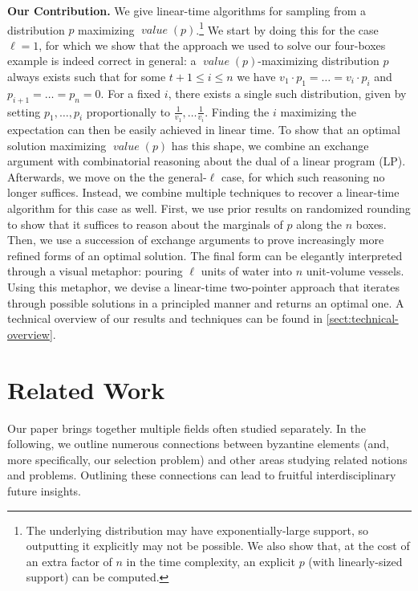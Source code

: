 \documentclass[sigconf,nonacm]{aamas}
\DeclareMathOperator{\valueText}{\textit{value}}
\newcommand{\val}[1]{\valueText({#1})}
\begin{document}
\textbf{Our Contribution.} We give linear-time algorithms for sampling from a distribution $p$ maximizing $\val{p}$.\footnote{The underlying distribution may have exponentially-large support, so outputting it explicitly may not be possible. We also show that, at the cost of an extra factor of $n$ in the time complexity, an explicit $p$ (with linearly-sized support) can be computed.} We start by doing this for the case $\ell = 1$, for which we show that the approach we used to solve our four-boxes example is indeed correct in general: a $\val{p}$-maximizing distribution $p$ always exists such that for some $t + 1 \leq i \leq n$ we have $v_1 \cdot p_1 = \dots = v_i \cdot p_i$ and $p_{i + 1} = \dots = p_n = 0$. For a fixed $i$, there exists a single such distribution, given by setting $p_1, \dots, p_i$ proportionally to $\frac{1}{v_1}, \dots \frac{1}{v_i}$. Finding the $i$ maximizing the expectation can then be easily achieved in linear time. To show that an optimal solution maximizing $\val{p}$ has this shape, we combine an exchange argument with combinatorial reasoning about the dual of a linear program (LP). Afterwards, we move on the the general-$\ell$ case, for which such reasoning no longer suffices. Instead, we combine multiple techniques to recover a linear-time algorithm for this case as well. First, we use prior results on randomized rounding to show that it suffices to reason about the marginals of $p$ along the $n$ boxes. Then, we use a succession of exchange arguments to prove increasingly more refined forms of an optimal solution. The final form can be elegantly interpreted through a visual metaphor: pouring $\ell$ units of water into $n$ unit-volume vessels. Using this metaphor, we devise a linear-time two-pointer approach that iterates through possible solutions in a principled manner and returns an optimal one. A technical overview of our results and techniques can be found in \cref{sect:technical-overview}. 


\section{Related Work}

Our paper brings together multiple fields often studied separately. In the following, we outline numerous connections between byzantine elements (and, more specifically, our selection problem) and other areas studying related notions and problems. Outlining these connections can lead to fruitful interdisciplinary future insights.
\end{document}
